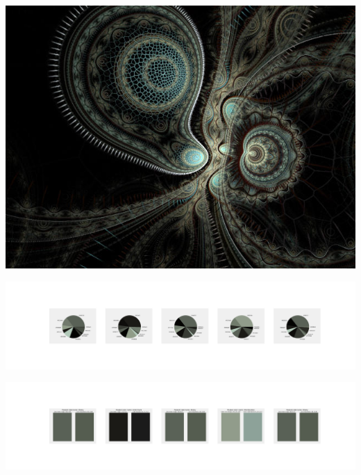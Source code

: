 \documentclass[11pt]{article}
\begin{document}
\begin{landscape}
    \begin{center}
    \includegraphics[width=\textwidth]{./nbimg/file (28).jpg}
    \end{center}

    \begin{center}
    \includegraphics[width=250mm]{./nbimg/pie-200.jpg}
    \end{center}

    \begin{center}
    \includegraphics[width=250mm]{./nbimg/peak-200.jpg}
    \end{center}
    


\end{landscape}
\end{document}
